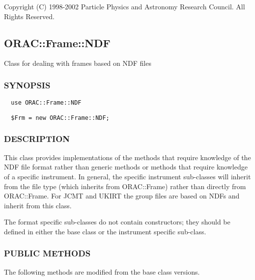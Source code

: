 Copyright (C) 1998-2002 Particle Physics and Astronomy Research
Council. All Rights Reserved.

\subsection{ORAC::Frame::NDF\label{ORAC::Frame::NDF}}


Class for dealing with frames based on NDF files

\subsubsection*{SYNOPSIS\label{ORAC::Frame::NDF_SYNOPSIS}}
\begin{verbatim}
  use ORAC::Frame::NDF
\end{verbatim}
\begin{verbatim}
  $Frm = new ORAC::Frame::NDF;
\end{verbatim}
\subsubsection*{DESCRIPTION\label{ORAC::Frame::NDF_DESCRIPTION}}


This class provides implementations of the methods that require
knowledge of the NDF file format rather than generic methods or
methods that require knowledge of a specific instrument.  In general,
the specific instrument sub-classes will inherit from the file type
(which inherits from ORAC::Frame) rather than directly from
ORAC::Frame. For JCMT and UKIRT the group files are based on NDFs and
inherit from this class.



The format specific sub-classes do not contain constructors; they 
should be defined in either the base class or the instrument specific
sub-class.

\subsubsection*{PUBLIC METHODS\label{ORAC::Frame::NDF_PUBLIC_METHODS}}


The following methods are modified from the base class versions.

